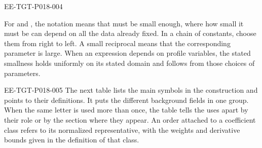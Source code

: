 \begin{EESegment}{EE-TGT-P018-004}
\begin{definition}\label{def:3.3}
For  and , the notation
 means that
 must be small enough, where how small it must be can
depend on all the data already fixed. In a chain of constants, choose them from right to
left. A small reciprocal means that the corresponding parameter is large. When an
expression depends on profile variables, the stated smallness holds uniformly on its stated
domain and follows from those choices of parameters.
\end{definition}
\end{EESegment}

\begin{EESegment}{EE-TGT-P018-005}
The next table lists the main symbols in the construction and points to their definitions.
It puts the different background fields in one group. When the same letter is used more
than once, the table tells the uses apart by their role or by the section where they appear.
An order attached to a coefficient class refers to its normalized representative, with the
weights and derivative bounds given in the definition of that class.
\end{EESegment}
